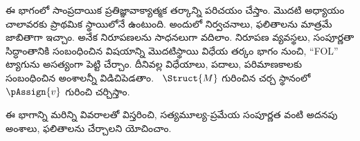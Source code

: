 \documentclass[../../include/open-logic-part]{subfiles}
\begin{document}

\begin{editorial}
  ఈ భాగంలో సాంప్రదాయిక ప్రతిజ్ఞావాక్యాత్మక తర్కాన్ని పరిచయం చేస్తాం. మొదటి
  అధ్యాయం చాలావరకు ప్రాథమిక స్థాయిలోనే ఉంటుంది. అందులో నిర్వచనాలు, ఫలితాలను మాత్రమే
  జాబితాగా ఇచ్చాం. అనేక నిరూపణలను సాధనలుగా
  వదిలాం. నిరూపణ వ్యవస్థలు, సంపూర్ణతా సిద్ధాంతానికి సంబంధించిన
  విషయాన్ని మొదటిస్థాయి విధేయ తర్కం భాగం నుంచి, “FOL” ట్యాగును అసత్యంగా
  పెట్టి చేర్చాం. దీనివల్ల విధేయాలు, పదాలు, పరిమాణకాలకు సంబంధించిన
  అంశాలన్నీ విడిచిపెడతాం. ~$\Struct{M}$ గురించిన చర్చ స్థానంలో
  ~$\pAssign{v}$ గురించి చర్చిస్తాం.

  ఈ భాగాన్ని మరిన్ని వివరాలతో విస్తరించి, సత్యమూల్య-ప్రమేయ
  సంపూర్ణత వంటి అదనపు అంశాలు, ఫలితాలను చేర్చాలని యోచించాం.
\end{editorial}










\OLEndPartHook
\end{document}
